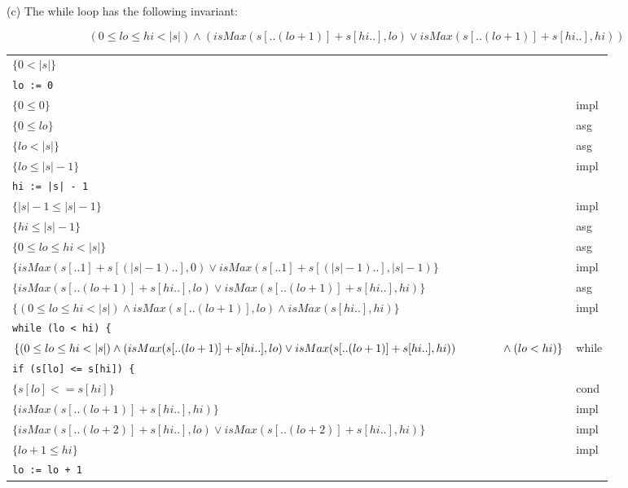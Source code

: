\documentclass[12pt]{article}
\begin{document}
\noindent (c) The while loop has the following invariant:

$$(0 \le lo \le hi < |s|) \wedge (isMax(s[..(lo+1)] + s[hi..], lo) \vee isMax(s[..(lo+1)] + s[hi..], hi))$$

\begin{center}
    \begin{tabular}{ll}
        $\{ 0 < |s| \}$ & \\
        {\color{gray} \texttt{lo := 0}} & \\
        $\{ 0 \le 0 \}$ & impl \\
        $\{ 0 \le lo \}$ & asg \\
        $\{ lo < |s| \}$ & asg \\
        $\{ lo \le |s| - 1 \}$ & impl \\
        {\color{gray} \texttt{hi := |s| - 1}} & \\
        $\{ |s| - 1 \le |s| - 1 \}$ & impl \\
        $\{ hi \le |s| - 1 \}$ & asg \\
        $\{ 0 \le lo \le hi < |s| \}$ & asg \\
        $\{ isMax(s[..1] + s[(|s| - 1)..], 0) \vee isMax(s[..1] + s[(|s| - 1)..], |s| - 1) \}$ & impl \\
        $\{ isMax(s[..(lo + 1)] + s[hi..], lo) \vee isMax(s[..(lo + 1)] + s[hi..], hi) \}$ & asg \\
        $\{ (0 \le lo \le hi < |s|) \wedge isMax(s[..(lo+1)], lo) \wedge isMax(s[hi..], hi) \}$ & impl \\
        {\color{gray} \texttt{while (lo < hi) \{}} & \\
        \qquad $\{ (0 \le lo \le hi < |s|) \wedge (isMax(s[..(lo+1)] + s[hi..], lo) \vee isMax(s[..(lo+1)] + s[hi..], hi)) \\
            \qquad \qquad \wedge (lo < hi) \}$ & while \\
        {\color{gray} \qquad \texttt{if (s[lo] <= s[hi]) \{}} & \\
        \qquad \qquad $\{ s[lo] <= s[hi] \}$ & cond \\
        \qquad \qquad $\{ isMax(s[..(lo + 1)] + s[hi..], hi) \}$ & impl \\
        \qquad \qquad $\{ isMax(s[..(lo + 2)] + s[hi..], lo) \vee isMax(s[..(lo + 2)] + s[hi..], hi) \}$ & impl \\
        \qquad \qquad $\{ lo + 1 \le hi \}$ & impl \\
        {\color{gray} \qquad \qquad \texttt{lo := lo + 1}} & \\

\end{tabular}
\end{center}
\end{document}
